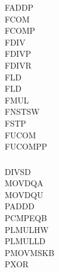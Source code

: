 \begin{description}
  \item[FADDP]
  \item[FCOM]
  \item[FCOMP]
  \item[FDIV]
  \item[FDIVP]
  \item[FDIVR]
  \item[FLD]
  \item[FLD]
  \item[FMUL]
  \item[FNSTSW]
  \item[FSTP]
  \item[FUCOM]
  \item[FUCOMPP]
\end{description}

\subsubsection{}

\begin{description}
  \item[DIVSD]
  \item[MOVDQA]
  \item[MOVDQU]
  \item[PADDD]
  \item[PCMPEQB]
  \item[PLMULHW]
  \item[PLMULLD]
  \item[PMOVMSKB]
  \item[PXOR]
\end{description}
\fi


